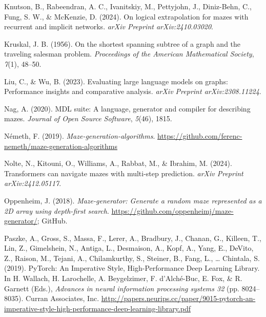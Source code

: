 \documentclass[10pt,a4paper,onecolumn]{article}
\newlength{\cslhangindent}
\newenvironment{CSLReferences}[2] %
 {\begin{list}{}{%
  \setlength{\itemindent}{0pt}
  \setlength{\leftmargin}{0pt}
  \setlength{\parsep}{0pt}
  \ifodd #1
   \setlength{\leftmargin}{\cslhangindent}
   \setlength{\itemindent}{-1\cslhangindent}
  \fi
  \setlength{\itemsep}{#2\baselineskip}}}
 {\end{list}}
\begin{document}
\begin{CSLReferences}{1}{0.5}
\leavevmode{}%
Knutson, B., Rabeendran, A. C., Ivanitskiy, M., Pettyjohn, J.,
Diniz-Behn, C., Fung, S. W., \& McKenzie, D. (2024). On logical
extrapolation for mazes with recurrent and implicit networks.
\emph{arXiv Preprint arXiv:2410.03020}.

\leavevmode{}%
Kruskal, J. B. (1956). On the shortest spanning subtree of a graph and
the traveling salesman problem. \emph{Proceedings of the American
Mathematical Society}, \emph{7}(1), 48--50.

\leavevmode{}%
Liu, C., \& Wu, B. (2023). Evaluating large language models on graphs:
Performance insights and comparative analysis. \emph{arXiv Preprint
arXiv:2308.11224}.

\leavevmode{}%
Nag, A. (2020). MDL suite: A language, generator and compiler for
describing mazes. \emph{Journal of Open Source Software}, \emph{5}(46),
1815.

\leavevmode{}%
Németh, F. (2019). \emph{Maze-generation-algorithms}.
\url{https://github.com/ferenc-nemeth/maze-generation-algorithms}

\leavevmode{}%
Nolte, N., Kitouni, O., Williams, A., Rabbat, M., \& Ibrahim, M. (2024).
Transformers can navigate mazes with multi-step prediction. \emph{arXiv
Preprint arXiv:2412.05117}.

\leavevmode{}%
Oppenheim, J. (2018). \emph{Maze-generator: Generate a random maze
represented as a 2D array using depth-first search}.
\url{https://github.com/oppenheimj/maze-generator/}; GitHub.

\leavevmode{}%
Paszke, A., Gross, S., Massa, F., Lerer, A., Bradbury, J., Chanan, G.,
Killeen, T., Lin, Z., Gimelshein, N., Antiga, L., Desmaison, A., Kopf,
A., Yang, E., DeVito, Z., Raison, M., Tejani, A., Chilamkurthy, S.,
Steiner, B., Fang, L., \ldots{} Chintala, S. (2019). {PyTorch: An
Imperative Style, High-Performance Deep Learning Library}. In H.
Wallach, H. Larochelle, A. Beygelzimer, F. d'Alché-Buc, E. Fox, \& R.
Garnett (Eds.), \emph{Advances in neural information processing systems
32} (pp. 8024--8035). Curran Associates, Inc.
\url{http://papers.neurips.cc/paper/9015-pytorch-an-imperative-style-high-performance-deep-learning-library.pdf}


\end{CSLReferences}
\end{document}
